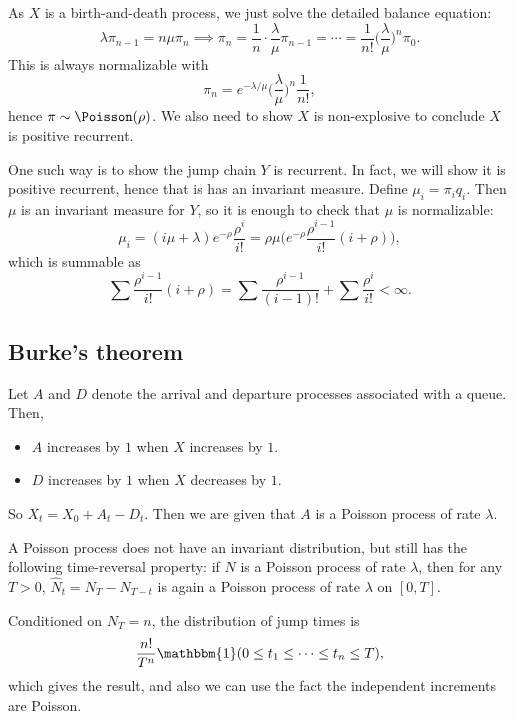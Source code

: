 \documentclass[12pt]{article}
\begin{document}
\begin{proofbox}
	As $X$ is a birth-and-death process, we just solve the detailed balance equation:
	\[
	\lambda \pi_{n-1} = n \mu \pi_n \implies \pi_n = \frac{1}{n} \cdot \frac{\lambda}{\mu} \pi_{n-1} = \cdots = \frac{1}{n!} \biggl( \frac{\lambda}{\mu} \biggr)^{n} \pi_0.
	\]
	This is always normalizable with
	\[
	\pi_n = e^{-\lambda/\mu} \biggl( \frac{\lambda}{\mu} \biggr)^{n} \frac{1}{n!},
	\]
	hence $\pi \sim \Poisson(\rho)$. We also need to show $X$ is non-explosive to conclude $X$ is positive recurrent.

	One such way is to show the jump chain $Y$ is recurrent. In fact, we will show it is positive recurrent, hence that is has an invariant measure. Define $\mu_i = \pi_i q_i$. Then $\mu$ is an invariant measure for $Y$, so it is enough to check that $\mu$ is normalizable:
	\[
	\mu_i = (i \mu + \lambda) e^{-\rho} \frac{\rho^{i}}{i!} = \rho \mu \biggl( e^{-\rho} \frac{\rho^{i-1}}{i!} (i + \rho) \biggr),
	\]
	which is summable as
	\[
	\sum \frac{\rho^{i-1}}{i!} (i + \rho) = \sum \frac{\rho^{i-1}}{(i-1)!} + \sum \frac{\rho^{i}}{i!} < \infty.
	\]
\end{proofbox}

\subsection{Burke's theorem}
\label{sub:burkes_theorem}

Let $A$ and $D$ denote the arrival and departure processes associated with a queue. Then,
\begin{itemize}
	\item $A$ increases by $1$ when $X$ increases by $1$.
	\item $D$ increases by $1$ when $X$ decreases by $1$.
\end{itemize}
So $X_t = X_0 + A_t - D_t$. Then we are given that $A$ is a Poisson process of rate $\lambda$.

\begin{remark}
	A Poisson process does not have an invariant distribution, but still has the following time-reversal property: if $N$ is a Poisson process of rate $\lambda$, then for any $T > 0$, $\hat N_t = N_T - N_{T - t}$ is again a Poisson process of rate $\lambda$ on $[0,T]$.
\end{remark}

\begin{proofbox}
	Conditioned on $N_T = n$, the distribution of jump times is
	\[
		\frac{n!}{T^{n}} \mathbbm{1}(0 \leq t_1 \leq \cdots \leq t_n \leq T),
	\]
	which gives the result, and also we can use the fact the independent increments are Poisson.
\end{proofbox}
\end{document}
